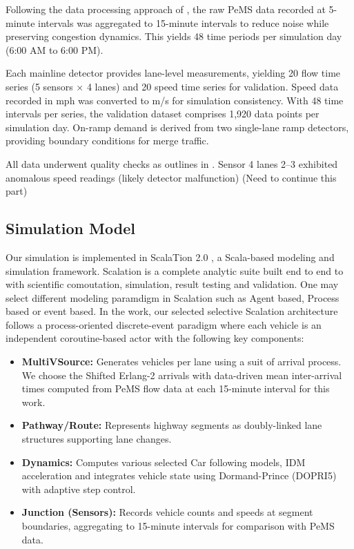 \documentclass{scspaperproc}
\theoremstyle{scsthe}
\begin{document}
    Following the data processing approach of \cite{bowman2022microscopic}, the raw PeMS
    data recorded at 5-minute intervals was aggregated to 15-minute intervals to reduce
    noise while preserving congestion dynamics. This yields 48 time periods per simulation
    day (6:00 AM to 6:00 PM).

    Each mainline detector provides lane-level measurements, yielding 20 flow time series
    (5 sensors $\times$ 4 lanes) and 20 speed time series for validation. Speed data
    recorded in mph was converted to m/s for simulation consistency. With 48 time
    intervals per series, the validation dataset comprises 1,920 data points per
    simulation day. On-ramp demand is derived from two single-lane ramp detectors,
    providing boundary conditions for merge traffic.

    All data underwent quality checks as outlines in \cite{law2007simulation} \cite{sargent2020verification} \cite{balci1995principles}. Sensor 4 lanes 2--3 exhibited anomalous speed readings (likely detector malfunction) (Need to continue this part)

    \subsection{Simulation Model}
    Our simulation is implemented in ScalaTion 2.0 \cite{miller2010using} \cite{miller2017advanced}, a Scala-based modeling and simulation framework. Scalation is a complete analytic suite built end to end to with scientific comoutation, simulation, result testing and validation. One may select different modeling paramdigm in Scalation such as Agent based, Process based or event based. In the work, our selected selective Scalation architecture follows a process-oriented discrete-event paradigm where each vehicle is an independent coroutine-based actor \cite{miller2017advanced} with the following key components:

    \begin{itemize}
        \item \textbf{MultiVSource:} Generates vehicles per lane using a suit of arrival process. We choose the Shifted Erlang-2 arrivals with data-driven mean inter-arrival times computed from PeMS flow data at each 15-minute interval for this work.
        \item \textbf{Pathway/Route:} Represents highway segments as doubly-linked lane structures supporting lane changes.
        \item \textbf{Dynamics:} Computes various selected Car following models,  IDM acceleration and integrates vehicle state using Dormand-Prince (DOPRI5) with adaptive step control.
        \item \textbf{Junction (Sensors):} Records vehicle counts and speeds at segment boundaries, aggregating to 15-minute intervals for comparison with PeMS data.
    \end{itemize}
\end{document}
